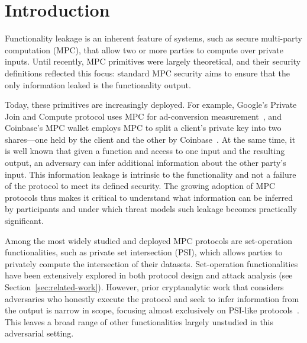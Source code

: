  
\section{Introduction}
\label{sec:introduction}
Functionality leakage is an inherent feature of systems, such as secure multi-party computation (MPC), that allow two or more parties to compute over private inputs. Until recently, MPC primitives were largely theoretical, and their security definitions reflected this focus: standard MPC security aims to ensure that the only information leaked is the functionality output.

Today, these primitives are increasingly deployed. For example, Google’s Private Join and Compute protocol uses MPC for ad-conversion measurement~\cite{googlePJC}, and Coinbase's MPC wallet employs MPC to split a client's private key into two shares---one held by the client and the other by Coinbase~\cite{Coinbase}. At the same time, it is well known that given a function and access to one input and the resulting output, an adversary can infer additional information about the other party's input. This information leakage is intrinsic to the functionality and not a failure of the protocol to meet its defined security. The growing adoption of MPC protocols thus makes it critical to understand what information can be inferred by participants and under which threat models such leakage becomes practically significant. 

Among the most widely studied and deployed MPC protocols are set-operation functionalities, such as private set intersection (PSI), which allows parties to privately compute the intersection of their datasets. Set-operation functionalities have been extensively explored in both protocol design and attack analysis (see Section~\ref{sec:related-work}). However, prior cryptanalytic work that considers adversaries who honestly execute the protocol and seek to infer information from the output is narrow in scope, focusing almost exclusively on PSI-like protocols~\cite{USENIX:GHLWJL22, NDSS:JiaDuYan24, USENIX:FalTan25}. This leaves a broad range of other functionalities largely unstudied in this adversarial setting.


